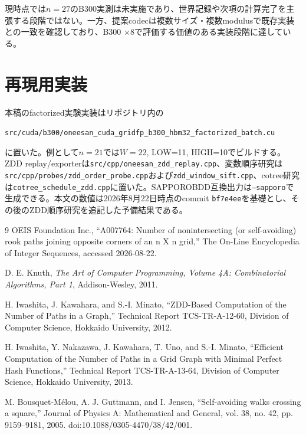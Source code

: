 \documentclass[a4paper,10pt,twocolumn]{ltjsarticle}
\newcommand{\code}[1]{\texttt{#1}}
\begin{document}
現時点では$n=27$のB300実測は未実施であり、世界記録や次項の計算完了を主張する段階ではない。一方、提案codecは複数サイズ・複数modulusで既存実装との一致を確認しており、B300 $\times8$で評価する価値のある実装段階に達している。

\section*{再現用実装}
本稿のfactorized実験実装はリポジトリ内の
\begin{center}
\code{src/cuda/b300/}\allowbreak\code{oneesan\_cuda\_gridfp\_b300\_hbm32\_factorized\_batch.cu}
\end{center}
に置いた。例として$n=21$では$W=22$, LOW=11, HIGH=10でビルドする。ZDD replay/exporterは\code{src/cpp/oneesan\_zdd\_replay.cpp}、変数順序研究は\code{src/cpp/probes/zdd\_order\_probe.cpp}および\code{zdd\_window\_sift.cpp}、cotree研究は\code{cotree\_schedule\_zdd.cpp}に置いた。SAPPOROBDD互換出力は\code{--sapporo}で生成できる。本文の数値は2026年8月22日時点のcommit \code{bf7e4ee}を基礎とし、その後のZDD順序研究を追記した予備結果である。

{\small
\begin{thebibliography}{9}
OEIS Foundation Inc., ``A007764: Number of nonintersecting (or self-avoiding) rook paths joining opposite corners of an n X n grid,'' The On-Line Encyclopedia of Integer Sequences, accessed 2026-08-22.

D. E. Knuth, \textit{The Art of Computer Programming, Volume 4A: Combinatorial Algorithms, Part 1}, Addison-Wesley, 2011.

H. Iwashita, J. Kawahara, and S.-I. Minato, ``ZDD-Based Computation of the Number of Paths in a Graph,'' Technical Report TCS-TR-A-12-60, Division of Computer Science, Hokkaido University, 2012.

H. Iwashita, Y. Nakazawa, J. Kawahara, T. Uno, and S.-I. Minato, ``Efficient Computation of the Number of Paths in a Grid Graph with Minimal Perfect Hash Functions,'' Technical Report TCS-TR-A-13-64, Division of Computer Science, Hokkaido University, 2013.

M. Bousquet-M\'elou, A. J. Guttmann, and I. Jensen, ``Self-avoiding walks crossing a square,'' Journal of Physics A: Mathematical and General, vol. 38, no. 42, pp. 9159--9181, 2005. doi:10.1088/0305-4470/38/42/001.
\end{thebibliography}
}
\end{document}
